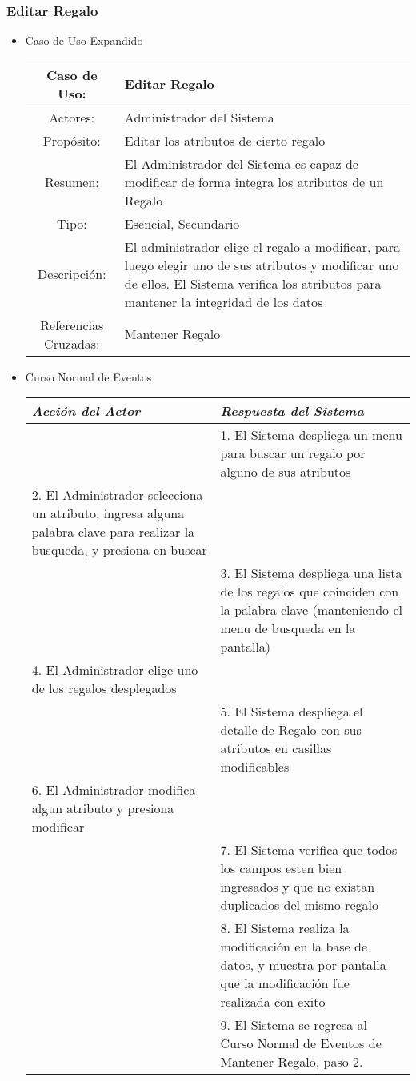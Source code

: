 \subsubsection{Editar Regalo}
\begin{itemize}
	\item Caso de Uso Expandido\\
		\begin{tabular}{|c|p{9.5cm}|}\hline
			Caso de Uso: & Editar Regalo\\\hline
			Actores: & Administrador del Sistema\\\hline
			Propósito: & Editar los atributos de cierto regalo\\\hline
			Resumen: & El Administrador del Sistema es capaz de modificar de forma integra los atributos de un Regalo\\\hline
			Tipo: & Esencial, Secundario \\\hline
			Descripción: & El administrador elige el regalo a modificar, para luego elegir uno de sus atributos y modificar uno de ellos. El Sistema verifica los atributos para mantener la integridad de los datos\\\hline
			Referencias Cruzadas: & Mantener Regalo \\\hline
		\end{tabular}

	\item Curso Normal de Eventos\\
		\begin{tabular}{|p{6.6cm}|p{6.6cm}|}\hline
			\emph{Acción del Actor} & \emph{Respuesta del Sistema}\\\hline
			& 1. El Sistema despliega un menu para buscar un regalo por alguno de sus atributos\\\hline
			2. El Administrador selecciona un atributo, ingresa alguna palabra clave para realizar la busqueda, y presiona en buscar&\\\hline
			& 3. El Sistema despliega una lista de los regalos que coinciden con la palabra clave (manteniendo el menu de busqueda en la pantalla)\\\hline
			4. El Administrador elige uno de los regalos desplegados&\\\hline
			& 5. El Sistema despliega el detalle de Regalo con sus atributos en casillas modificables\\\hline
			6. El Administrador modifica algun atributo y presiona modificar&\\\hline
			& 7. El Sistema verifica que todos los campos esten bien ingresados y que no existan duplicados del mismo regalo\\\hline
			& 8. El Sistema realiza la modificaci\'on en la base de datos, y muestra por pantalla que la modificaci\'on fue realizada con exito \\\hline
			& 9. El Sistema se regresa al Curso Normal de Eventos de Mantener Regalo, paso 2.\\\hline
		\end{tabular}


\end{itemize}
